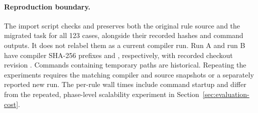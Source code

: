 \paragraph{Reproduction boundary.}
The import script checks and preserves both the original rule source and
the migrated task for all 123 cases, alongside their recorded hashes and
command outputs. It does not relabel them as a current compiler run.
Run A and run B have compiler SHA-256 prefixes
 and , respectively, with recorded
checkout revision . Commands containing temporary paths
are historical. Repeating the experiments requires the matching compiler
and source snapshots or a separately reported new run. The per-rule wall
times include command startup and differ from the repeated, phase-level
scalability experiment in Section~\ref{sec:evaluation-cost}.
